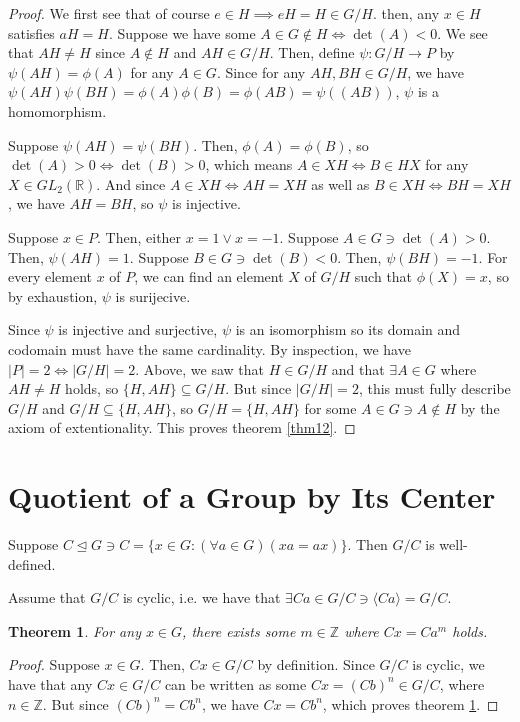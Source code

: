\documentclass[12pt]{article}
\newcommand{\reals}{\mathbb{R}}
\newcommand{\ints}{\mathbb{Z}}
\newcommand{\gltwo}{GL_2(\reals)}
\newtheorem{thm}{Theorem}
\begin{document}
\begin{proof}
We first see that of course $e \in H \implies eH = H \in G/H$.
then, any $x \in H$ satisfies $aH = H$.
Suppose we have some $A \in G \not\in H \iff \det(A) < 0$.
We see that $AH \neq H$ since $A \not\in H$ and $AH \in G/H$.
Then, define $\psi:G/H \to P$ by $\psi(AH) = \phi(A)$ for any $A \in G$.
Since for any $AH, BH \in G/H$,
we have $\psi(AH)\psi(BH) = \phi(A)\phi(B) = \phi(AB) = \psi((AB))$,
$\psi$ is a homomorphism.

Suppose $\psi(AH) = \psi(BH)$.
Then, $\phi(A) = \phi(B)$,
so $\det(A) > 0 \iff \det(B) > 0$,
which means $A \in XH \iff B \in HX$
for any $X \in \gltwo$.
And since $A \in XH \iff AH = XH$
as well as $B \in XH \iff BH = XH$,
we have $AH = BH$,
so $\psi$ is injective.

Suppose $x \in P$.
Then, either $x = 1 \lor x = -1$.
Suppose $A \in G \ni \det(A) > 0$.
Then, $\psi(AH) = 1$.
Suppose $B \in G \ni \det(B) < 0$.
Then, $\psi(BH) = -1$.
For every element $x$ of $P$,
we can find an element $X$ of $G/H$
such that $\phi(X) = x$,
so by exhaustion,
$\psi$ is surijecive.

Since $\psi$ is injective and surjective,
$\psi$ is an isomorphism so its
domain and codomain
must have the same cardinality.
By inspection, we have $|P| = 2 \iff |G/H| = 2$.
Above, we saw that $H \in G/H$
and that $\exists A \in G$
where $AH \neq H$ holds,
so $\{H, AH\} \subseteq G/H$.
But since $|G/H| = 2$,
this must fully describe $G/H$
and $G/H \subseteq \{ H, AH \}$,
so $G/H = \{H, AH\}$
for some $A \in G \ni A \not\in H$
by the axiom of extentionality.
This proves theorem \ref{thm12}.
\end{proof}

\section{Quotient of a Group by Its Center}

Suppose $C \trianglelefteq G \ni C = \{x \in G : (\forall a \in G)(xa = ax) \}$.
Then $G/C$ is well-defined.

Assume that $G/C$ is cyclic, i.e.
we have that $\exists Ca \in G/C \ni \langle Ca \rangle = G/C$.

\begin{thm} \label{thm13}
	For any $x \in G$, there exists some $m \in \ints$ where $Cx = Ca^m$ holds.
\end{thm}

\begin{proof}
	Suppose $x \in G$.
	Then, $Cx \in G/C$ by definition.
	Since $G/C$ is cyclic,
	we have that any $Cx \in G/C$
	can be written as some $Cx = (Cb)^n \in G/C$,
	where $n \in \ints$.
	But since $(Cb)^n = Cb^n$,
	we have $Cx = Cb^n$,
	which proves theorem \ref{thm13}.
\end{proof}
\end{document}
